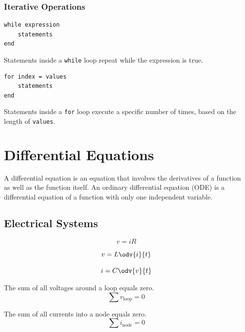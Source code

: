 \documentclass{article}
\begin{document}
\subsubsection{Iterative Operations}
\begin{multicols}{2}
    \begin{lstlisting}
while expression
    statements
end
    \end{lstlisting}
    \columnbreak
    Statements inside a \lstinline{while} loop repeat while the expression is true.
\end{multicols}
\begin{multicols}{2}
    \begin{lstlisting}
for index = values
    statements
end
    \end{lstlisting}
    \columnbreak
    Statements inside a \lstinline{for} loop execute a specific number of times, based on the length of \lstinline{values}.
\end{multicols}
\section{Differential Equations}
\begin{definition}
    A differential equation is an equation that involves the derivatives of a function as well as the function itself.
    An ordinary differential equation (ODE) is a differential equation of a function with only one independent variable.
\end{definition}
\subsection{Electrical Systems}
\begin{theorem}
    \begin{equation*}
        v = i R
    \end{equation*}
\end{theorem}
\begin{theorem}
    \begin{equation*}
        v = L \odv{i}{t}
    \end{equation*}
\end{theorem}
\begin{theorem}
    \begin{equation*}
        i = C \odv{v}{t}
    \end{equation*}
\end{theorem}
\begin{theorem}
    The sum of all voltages around a loop equals zero.
    \begin{equation*}
        \sum v_{\mathrm{loop}} = 0
    \end{equation*}
\end{theorem}
\begin{theorem}
    The sum of all currents into a node equals zero.
    \begin{equation*}
        \sum i_{\mathrm{node}} = 0
    \end{equation*}
\end{theorem}
\end{document}
